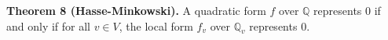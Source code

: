 \textbf{Theorem 8 (Hasse-Minkowski).} A quadratic form $f$ over $\mathbb{Q}$ represents $0$ if and only if for all $v \in V$, the local form $f_v$ over $\mathbb{Q}_v$ represents $0$.
